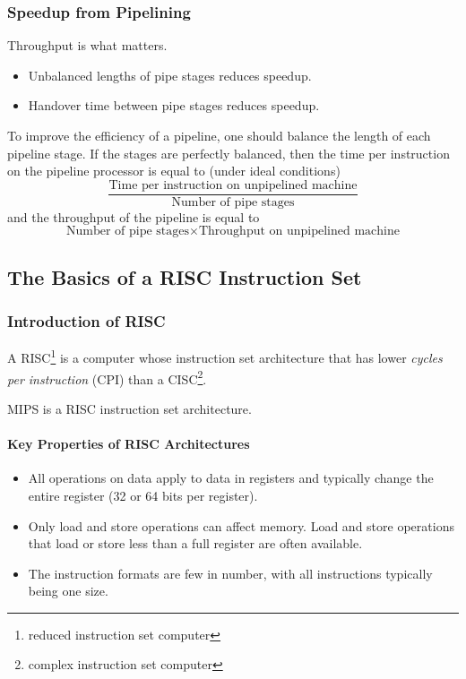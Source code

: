 \documentclass[12pt, a4paper]{article}
\theoremstyle{margin}
\begin{document}
    \subsubsection{Speedup from Pipelining}

      \indent 

      Throughput is what matters.

      \begin{itemize}
        \item Unbalanced lengths of pipe stages reduces speedup. 
        \item Handover time between pipe stages reduces speedup.
      \end{itemize}

      To improve the efficiency of a pipeline, one should balance the length of each pipeline stage. If the stages are perfectly balanced, then the time per instruction on the pipeline processor is equal to (under ideal conditions) 
      $$\frac{\text{Time per instruction on unpipelined machine}}{\text{Number of pipe stages}}$$ 
      and the throughput of the pipeline is equal to 
      $$\text{Number of pipe stages} \times \text{Throughput on unpipelined machine}$$

  \subsection{The Basics of a RISC Instruction Set}

    \subsubsection{Introduction of RISC}

      \indent 

      A RISC\footnote{reduced instruction set computer} is a computer whose instruction set architecture that has lower \emph{cycles per instruction} (CPI) than a CISC\footnote{complex instruction set computer}.

      MIPS is a RISC instruction set architecture.

      \paragraph{Key Properties of RISC Architectures\cite{caqa}}
        \begin{itemize}
          \item All operations on data apply to data in registers and typically change the entire register (32 or 64 bits per register).
          \item Only load and store operations can affect memory. Load and store operations that load or store less than a full register are often available.
          \item The instruction formats are few in number, with all instructions typically being one size.
        \end{itemize}
\end{document}
